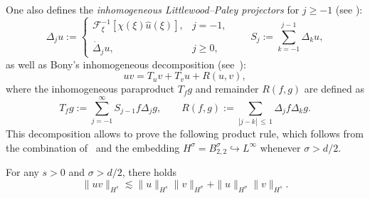 \documentclass[AHL,Unicode,longabstracts,published]{cedram}
\newcommand{\FF}{\mathcal{F}}
\renewcommand*\le{\leqslant}
\renewcommand*\ge{\geqslant}
\begin{document}
One also defines the \emph{inhomogeneous Littlewood--Paley projectors} for $j \ge -1$ (see \cite[Section~2.2]{BCD2011}):
\[
\Delta_j u :=
\begin{cases}
\FF^{-1}_\xi \left[\chi(\xi) \widehat{u}(\xi) \right], & j = -1, \\
\\
\dot{\Delta}_j u, & j \ge 0,
\end{cases} \qquad S_j := \sum_{k = -1}^{j-1} \Delta_k u,
\]
as well as Bony's inhomogeneous decomposition (see~\cite[Section~2.8.1]{BCD2011}):
\[
uv = T_u v + T_v u + R(u, v),
\]
where the inhomogeneous paraproduct $T_f g$ and remainder $R(f, g)$ are defined as
\[
T_f g := \sum_{j=-1}^\infty S_{j-1} f \Delta_j g, \qquad R(f, g) := \sum_{|j - k|\,\le\,1} \Delta_j f \Delta_k g.
\]
This decomposition allows to prove the following product rule, which follows from the combination of~\cite[Corollary~2.86]{BCD2011} and the embedding $H^{\sigma} = B^{\sigma}_{2, 2} \hookrightarrow L^\infty$ whenever $\sigma > d/2$.
\begin{prop}
For any $s > 0$ and $\sigma > d/2$, there holds
\[
\| u v \|_{H^s} \lesssim \| u \|_{H^s} \| v \|_{H^\sigma} + \| u \|_{H^\sigma} \| v \|_{H^s}.
\]
\end{prop}
\end{document}
